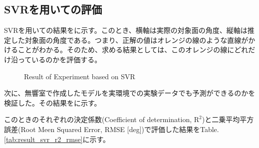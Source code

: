 \subsection{SVRを用いての評価}
\label{sec:result_svr}
SVRを用いての結果をに示す。このとき、横軸は実際の対象面の角度、縦軸は推定した対象面の角度である。つまり、正解の値はオレンジの線のような直線がかけることがわかる。そのため、求める結果としては、このオレンジの線にどれだけ沿っているのかを評価する。

\begin{figure}[tb]
    \centering
    \label{fig:result_svr_anechoic}
    \vspace{2zh}
    \label{fig:result_svr_real}
    \vspace{1zh}
    \caption{Result of Experiment based on SVR}
    \label{fig:result_svr_1}
\end{figure}

次に、無響室で作成したモデルを実環境での実験データでも予測ができるのかを検証した。その結果をに示す。

このときのそれぞれの決定係数(Coefficient of determination, $\mathrm{R}^2$)と二乗平均平方誤差(Root Meen Squared Error, RMSE [deg])で評価した結果をTable. \ref{tab:result_svr_r2_rmse}に示す。


